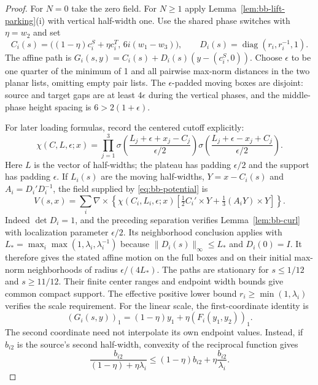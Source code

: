 \begin{proof}\label{ba:two-interpolations-proof}
For $N=0$ take the zero field.  For $N\ge1$ apply
Lemma~\ref{lem:bb-lift-parking}(i) with vertical half-width one.
Use the shared phase switches with $\eta=w_2$ and set
\[
 C_i(s)=\big((1-\eta)c_i^S+\eta c_i^T,\,6i(w_1-w_3)\big),
 \qquad D_i(s)=\operatorname{diag}(r_i,r_i^{-1},1).
\]
The affine path is
$G_i(s,y)=C_i(s)+D_i(s)(y-(c_i^S,0))$.
Choose $\epsilon$ to be one quarter of the minimum of 1 and all
pairwise max-norm distances in the two planar lists, omitting empty
pair lists.  The $\epsilon$-padded moving boxes are disjoint: source
and target gaps are at least $4\epsilon$ during the vertical phases,
and the middle-phase height spacing is $6>2(1+\epsilon)$.

For later loading formulas, record the centered cutoff explicitly:
\[
 \chi(C,L,\epsilon;x)=
 \prod_{j=1}^3\sigma\!\left(\frac{L_j+\epsilon+x_j-C_j}{\epsilon/2}\right)
 \sigma\!\left(\frac{L_j+\epsilon-x_j+C_j}{\epsilon/2}\right).
\]
Here $L$ is the vector of half-widths; the plateau has padding
$\epsilon/2$ and the support has padding $\epsilon$.
If $L_i(s)$ are the moving half-widths, $Y=x-C_i(s)$ and
$A_i=D_i'D_i^{-1}$, the field supplied by
\eqref{eq:bb-potential} is
\begin{equation}\label{ba:affine-box-field}
 V(s,x)=\sum_i\nabla\times\left\{
 \chi(C_i,L_i,\epsilon;x)
 \left[\tfrac12 C_i'\times Y+\tfrac13(A_iY)\times Y\right]
 \right\}.
\end{equation}
Indeed $\det D_i=1$, and the preceding separation verifies
Lemma~\ref{lem:bb-curl} with localization parameter $\epsilon/2$.
Its neighborhood conclusion applies with
$L_* =\max_i\max(1,\lambda_i,\lambda_i^{-1})$ because
$\|D_i(s)\|_\infty\le L_*$ and $D_i(0)=I$.
It therefore gives the stated affine motion on the full boxes and
on their initial max-norm neighborhoods of radius $\epsilon/(4L_*)$.
The paths are stationary for $s\le1/12$ and $s\ge11/12$.
Their finite center ranges and endpoint width bounds give common
compact support.  The effective positive lower bound
$r_i\ge\min(1,\lambda_i)$ verifies the scale requirement.
For the linear scale, the first-coordinate identity is
\[
 (G_i(s,y))_1=(1-\eta)y_1+\eta(F_i(y_1,y_2))_1.
\]
The second coordinate need not interpolate its own endpoint values.
Instead, if $b_{i2}$ is the source's second half-width, convexity of the
reciprocal function gives
\begin{equation}\label{eq:ba-reciprocal-envelope}
 \frac{b_{i2}}{(1-\eta)+\eta\lambda_i}
 \le (1-\eta)b_{i2}+\eta\frac{b_{i2}}{\lambda_i}.

\end{equation}
\end{proof}
